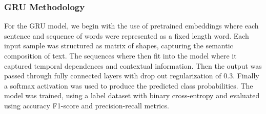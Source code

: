 \subsubsection{GRU Methodology}
\label{sec:gru}
For the GRU model, we begin with the use of pretrained embeddings where each sentence and sequence of words were represented as a fixed length word. Each input sample was structured as matrix of shapes, capturing the semantic composition of text. The sequences where then fit into the model where it captured temporal dependences and contextual information. Then the output was passed through fully connected layers with drop out regularization of 0.3. Finally a softmax activation was used to produce the predicted class probabilities. The model was trained, using a label dataset with binary cross-entropy and evaluated using accuracy F1-score and precision-recall metrics.